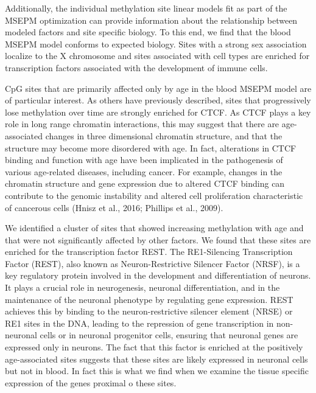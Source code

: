 \documentclass[sn-nature]{sn-jnl}
\begin{document}
{\begin{linenumbers}
Additionally, the individual methylation site linear models fit as part of the MSEPM optimization can provide 
information about the relationship between modeled factors and site specific biology.  To this end, we find that 
the blood MSEPM model conforms to expected biology. Sites with a strong sex association localize to the X chromosome
 and sites associated with cell types are enriched for transcription factors associated with the development of immune cells. 

CpG sites that are primarily affected only by age in the blood MSEPM model are of particular interest. As 
others have previously described, sites that progressively lose methylation over time are strongly enriched for
 CTCF\cite{De_Lima_Camillo2022-lu,Han2020-zj}.  As CTCF plays a key role in long range chromatin interactions, 
 this may suggest that there are age-associated changes in three dimensional chromatin structure, and that the  
 structure may become more disordered with age. In fact, alterations in CTCF binding and function with age 
 have been implicated in the pathogenesis of various age-related diseases, including cancer. For example, 
 changes in the chromatin structure and gene expression due to altered CTCF binding can contribute to the 
 genomic instability and altered cell proliferation characteristic of cancerous cells (Hnisz et al., 2016; Phillips et al., 2009).

We identified a cluster of sites that showed increasing methylation with age and that were not significantly 
affected by other factors.  We found that these sites are enriched for the transcription factor REST. The RE1-Silencing 
Transcription Factor (REST), also known as Neuron-Restrictive Silencer Factor (NRSF), is a key regulatory protein 
involved in the development and differentiation of neurons. It plays a crucial role in neurogenesis, neuronal 
differentiation, and in the maintenance of the neuronal phenotype by regulating gene expression\cite{Schoenherr1995-fc}. 
REST achieves this by binding to the neuron-restrictive silencer element (NRSE) or RE1 sites in the DNA, leading to the 
repression of gene transcription in non-neuronal cells or in neuronal progenitor cells, ensuring that neuronal genes 
are expressed only in neurons\cite{Chong1995-dj,Ooi2007-kk,Bruce2004-je}.  The fact that this factor 
is enriched at the positively age-associated sites suggests that these sites are likely expressed in neuronal cells 
but not in blood.  In fact this is what we find when we examine the tissue specific expression of the genes proximal 
o these sites.


\end{linenumbers}}
\end{document}

